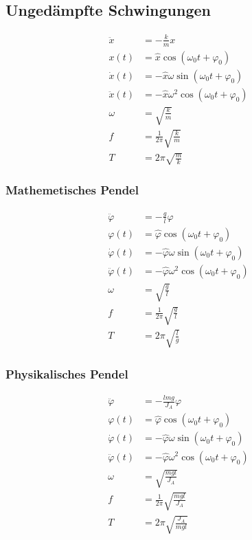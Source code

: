 \subsection{Ungedämpfte Schwingungen}

\begin{align*}
\ddot{x}&=-\frac{k}{m}x\\
x(t)&=\hat{x}\cos(\omega_0 t+\varphi_0)\\
\dot{x}(t)&=-\hat{x}\omega\sin(\omega_0 t+\varphi_0)\\
\ddot{x}(t)&=-\hat{x}\omega^2\cos(\omega_0 t+\varphi_0)\\
\omega&=\sqrt{\frac{k}{m}}\\
f&=\frac{1}{2\pi}\sqrt{\frac{k}{m}}\\
T&=2\pi\sqrt{\frac{m}{k}}
\end{align*}

\newpage
\begin{multicols}{2}{}
\subsubsection*{Mathemetisches Pendel}
\begin{align*}
\ddot{\varphi}&=-\frac{g}{l}\varphi\\
\varphi(t)&=\hat{\varphi}\cos(\omega_0 t+\varphi_0)\\
\dot{\varphi}(t)&=-\hat{\varphi}\omega\sin(\omega_0 t+\varphi_0)\\
\ddot{\varphi}(t)&=-\hat{\varphi}\omega^2\cos(\omega_0 t+\varphi_0)\\
\omega&=\sqrt{\frac{g}{l}}\\
f&=\frac{1}{2\pi}\sqrt{\frac{g}{l}}\\
T&=2\pi\sqrt{\frac{l}{g}}
\end{align*}

\subsubsection*{Physikalisches Pendel}
\begin{align*}
\ddot{\varphi}&=-\frac{lmg}{J_A}\varphi\\
\varphi(t)&=\hat{\varphi}\cos(\omega_0 t+\varphi_0)\\
\dot{\varphi}(t)&=-\hat{\varphi}\omega\sin(\omega_0 t+\varphi_0)\\
\ddot{\varphi}(t)&=-\hat{\varphi}\omega^2\cos(\omega_0 t+\varphi_0)\\
\omega&=\sqrt{\frac{mgl}{J_A}}\\
f&=\frac{1}{2\pi}\sqrt{\frac{mgl}{J_A}}\\
T&=2\pi\sqrt{\frac{J_A}{mgl}}
\end{align*}
\end{multicols}

